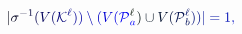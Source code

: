 \documentclass[12pt]{article}
\begin{document}
\makeatletter
\renewcommand*{\@textcolor}[3]{%
  \protect\leavevmode
  \begingroup
    \color#1{#2}#3%
  \endgroup
}
\makeatother
\begin{displaymath}
\mathcolor[RGB]{0,0,15}{|} \mathcolor[RGB]{0,0,30}{\sigma} ^ { \mathcolor[RGB]{0,0,45}{-} \mathcolor[RGB]{0,0,60}{1} } \mathcolor[RGB]{0,0,75}{(} \mathcolor[RGB]{0,0,90}{V} \mathcolor[RGB]{0,0,105}{(} \mathcal { \mathcolor[RGB]{0,0,120}{K} } ^ { \mathcolor[RGB]{0,0,135}{\ell} } \mathcolor[RGB]{0,0,150}{)} \mathcolor[RGB]{0,0,165}{)} \mathcolor[RGB]{0,0,180}{\setminus} \mathcolor[RGB]{0,0,195}{(} \mathcolor[RGB]{0,0,210}{V} \mathcolor[RGB]{0,0,225}{(} \mathcal { \mathcolor[RGB]{0,0,240}{P} } _ { \mathcolor[RGB]{0,0,255}{a} } ^ { \mathcolor[RGB]{0,15,0}{\ell} } \mathcolor[RGB]{0,15,15}{)} \mathcolor[RGB]{0,15,30}{\cup} \mathcolor[RGB]{0,15,45}{V} \mathcolor[RGB]{0,15,60}{(} \mathcal { \mathcolor[RGB]{0,15,75}{P} } _ { \mathcolor[RGB]{0,15,90}{b} } ^ { \mathcolor[RGB]{0,15,105}{\ell} } \mathcolor[RGB]{0,15,120}{)} \mathcolor[RGB]{0,15,135}{)} \mathcolor[RGB]{0,15,150}{|} \mathcolor[RGB]{0,15,165}{=} \mathcolor[RGB]{0,15,180}{1} \mathcolor[RGB]{0,15,195}{,}
\end{displaymath}
\end{document}

